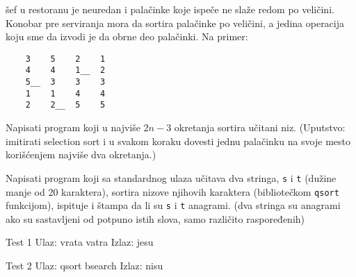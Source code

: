 \begin{Exercise}[label=512]
  šef u restoranu je neuredan i palačinke koje ispeče
  ne slaže redom po veličini. Konobar pre serviranja mora da
  sortira palačinke po veličini, a jedina operacija koju sme
  da izvodi je da obrne deo palačinki. Na primer:
\begin{verbatim}
    3    5    2    1
    4    4    1__  2
    5__  3    3    3
    1    1    4    4
    2    2__  5    5
\end{verbatim}
Napisati program koji u najviše $2n-3$ okretanja sortira učitani
niz. (Uputstvo: imitirati selection sort i u svakom koraku dovesti
jednu palačinku na svoje mesto korišćenjem najviše dva okretanja.)
    
\end{Exercise}

\begin{Exercise}[label=513]
  Napisati program koji sa standardnog ulaza učitava dva
  stringa, \verb|s| i \verb|t| (dužine manje od 20 karaktera),
  sortira nizove njihovih karaktera (bibliotečkom \verb|qsort|
  funkcijom), ispituje i štampa da li su \verb|s| i \verb|t|
  anagrami. (dva stringa su anagrami ako su sastavljeni od potpuno
  istih slova, samo različito raspoređenih)
  
\begin{minitest}
\begin{test}{Test 1}
Ulaz:   vrata vatra
Izlaz:  jesu
\end{test}
\end{minitest}
\begin{miditest}
\begin{test}{Test 2}
Ulaz:   qsort bsearch
Izlaz:  nisu
\end{test}
\end{miditest}
  
\end{Exercise}

